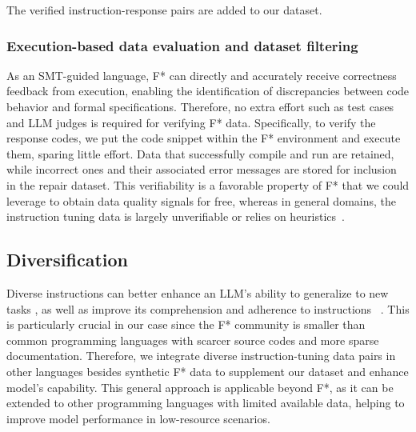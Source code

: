 The verified instruction-response pairs are added to our dataset.

\subsubsection{Execution-based data evaluation and dataset filtering}\label{Execution-based data evaluation and dataset filtering}
As an SMT-guided language, F* can directly and accurately receive correctness feedback from execution, enabling the identification of discrepancies between code behavior and formal specifications. Therefore, no extra effort such as test cases and LLM judges is required for verifying F* data. Specifically, to verify the response codes, we put the code snippet within the F* environment and execute them, sparing little effort. Data that successfully compile and run are retained, while incorrect ones and their associated error messages are stored for inclusion in the repair dataset. This verifiability is a favorable property of F* that we could leverage to obtain data quality signals for free, whereas in general domains, the instruction tuning data is largely unverifiable or relies on heuristics~\cite{wei2024selfcodealign}. 

\subsection{Diversification} \label{Diversification}
Diverse instructions can better enhance an LLM’s ability to generalize to new tasks \cite{wei2021finetuned}, as well as improve its comprehension and adherence to instructions ~\cite{chen2024diversity,zhang2024textbf,dong2023abilities}. This is particularly crucial in our case since the F* community is smaller than common programming languages with scarcer source codes and more sparse documentation. Therefore, we integrate diverse instruction-tuning data pairs in other languages besides synthetic F* data to supplement our dataset and enhance model's capability. This general approach is applicable beyond F*, as it can be extended to other programming languages with limited available data, helping to improve model performance in low-resource scenarios.

